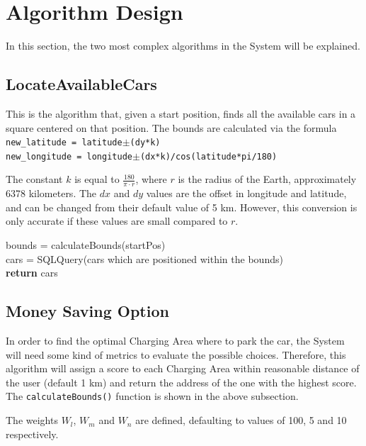 \documentclass[12pt]{article}
\begin{document}
\clearpage
\section{Algorithm Design}
In this section, the two most complex algorithms in the System will be explained.
\subsection{LocateAvailableCars}
This is the algorithm that, given a start position, finds all the available cars in a square centered on that position.
The bounds are calculated via the formula\\
\verb&new_latitude = latitude&$\pm$\verb&(dy*k)&\\
\verb&new_longitude = longitude&$\pm$\verb&(dx*k)/cos(latitude*pi/180)&

The constant $k$ is equal to $\frac{180}{\pi\cdot r}$, where $r$ is the radius of the Earth, approximately 6378 kilometers. The $dx$ and $dy$ values are the offset in longitude and latitude, and can be changed from their default value of 5 km. However, this conversion is only accurate if these values are small compared to $r$.

\begin{algorithm}[H]
 bounds = calculateBounds(startPos)\\ 
 cars = SQLQuery(cars which are positioned within the bounds)\\ 
 \textbf{return} cars
\end{algorithm}

\subsection{Money Saving Option}
In order to find the optimal Charging Area where to park the car, the System will need some kind of metrics to evaluate the possible choices. Therefore, this algorithm will assign a score to each Charging Area within reasonable distance of the user (default 1 km) and return the address of the one with the highest score. The \verb+calculateBounds()+ function is shown in the above subsection.

The weights $W_l$, $W_m$ and $W_n$ are defined, defaulting to values of 100, 5 and 10 respectively.
\end{document}
